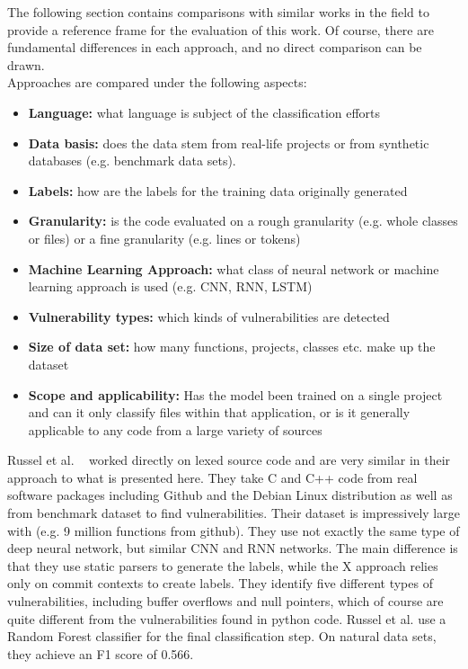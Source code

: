 \documentclass[
	a4paper,
	pagesize,
	pdftex,
	12pt,
	twoside, %
	BCOR=5mm, %
	ngerman,
	fleqn,
	final,
	]{scrartcl}
\begin{document}
The following section contains comparisons with similar works in the field to provide a reference frame for the evaluation of this work. Of course, there are fundamental differences in each approach, and no direct comparison can be drawn.\\
Approaches are compared under the following aspects:\\
\begin{itemize}
	\item \textbf{Language:} what language is subject of the classification efforts
	\item \textbf{Data basis:} does the data stem from real-life projects or from synthetic databases (e.g. benchmark data sets).
	\item \textbf{Labels:} how are the labels for the training data originally generated
	\item \textbf{Granularity:} is the code evaluated on a rough granularity (e.g. whole classes or files) or a fine granularity (e.g. lines or tokens)
	\item \textbf{Machine Learning Approach:} what class of neural network or machine learning approach is used (e.g. CNN, RNN, LSTM)
	\item \textbf{Vulnerability types:} which kinds of vulnerabilities are detected
	\item \textbf{Size of data set:} how many functions, projects, classes etc. make up the dataset
	\item \textbf{Scope and applicability:} Has the model been trained on a single project and can it only classify files within that application, or is it generally applicable to any code from a large variety of sources
\end{itemize}


Russel et al. ~\cite{Russell.2018} worked directly on lexed source code and are very similar in their approach to what is presented here. They take C and C++ code from real software packages including Github and the Debian Linux distribution as well as from benchmark dataset to find vulnerabilities. Their dataset is impressively large with (e.g. 9 million functions from github). They use not exactly the same type of deep neural network, but similar CNN and RNN networks. The main difference is that they use static parsers to generate the labels, while the X approach relies only on commit contexts to create labels. They identify five different types of vulnerabilities, including buffer overflows and null pointers, which of course are quite different from the vulnerabilities found in python code. Russel et al. use a Random Forest classifier for the final classification step. On natural data sets, they achieve an F1 score of 0.566.\\
\end{document}

